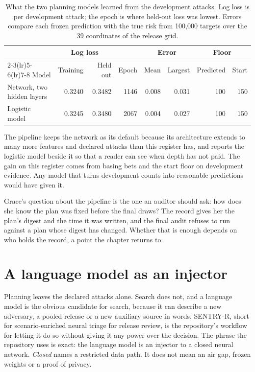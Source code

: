\begin{table}[ht]
\centering
\caption{What the two planning models learned from the development attacks. Log loss
is per development attack; the epoch is where held-out loss was lowest. Errors compare
each frozen prediction with the true risk from 100{,}000 targets over the 39
coordinates of the release grid.}
\label{c14:tab-fit}
\small\setlength{\tabcolsep}{4pt}
\begin{tabular}{lrrrrrrr}
\toprule
 & \multicolumn{2}{c}{Log loss} & & \multicolumn{2}{c}{Error} & \multicolumn{2}{c}{Floor}\\
\cmidrule(lr){2-3}\cmidrule(lr){5-6}\cmidrule(lr){7-8}
Model & Training & Held out & Epoch & Mean & Largest & Predicted & Start \\
\midrule
Network, two hidden layers & 0.3240 & 0.3482 & 1146 & 0.008 & 0.031 & 100 & 150 \\
Logistic model             & 0.3245 & 0.3480 & 2067 & 0.004 & 0.027 & 100 & 150 \\
\bottomrule
\end{tabular}
\end{table}

The pipeline keeps the network as its default because its architecture extends to many
more features and declared attacks than this register has, and reports the logistic
model beside it so that a reader can see when depth has not paid. The gain on this
register comes from basing bets and the start floor on development evidence. Any
model that turns development counts into reasonable predictions would have given it.

Grace's question about the pipeline is the one an auditor should ask: how does she
know the plan was fixed before the final draws? The record gives her the plan's
digest and the time it was written, and the final audit refuses to run against a plan
whose digest has changed. Whether that is enough depends on who holds the record, a
point the chapter returns to.

\section{A language model as an injector}\label{c14:sec-sentry}

Planning leaves the declared attacks alone. Search does not, and a language model is
the obvious candidate for search, because it can describe a new adversary, a pooled
release or a new auxiliary source in words. SENTRY-R, short for scenario-enriched
neural triage for release review, is the repository's workflow for letting it do so
without giving it any power over the decision. The phrase the repository uses is
exact: the language model is an injector to a closed neural network.
\emph{Closed} names a restricted data path. It does not mean an air gap, frozen
weights or a proof of privacy.

